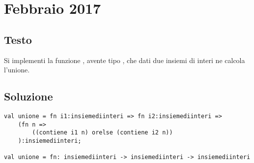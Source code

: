 \section{Febbraio 2017}

\subsection{Testo}

Si implementi la funzione , avente tipo , che dati due insiemi di interi ne calcola l'unione.

\subsection{Soluzione}

\begin{lstlisting}[style = SML, caption = {Definizione della funzione \sml{unione}}]
val unione = fn i1:insiemediinteri => fn i2:insiemediinteri =>
	(fn n =>
		((contiene i1 n) orelse (contiene i2 n))
	):insiemediinteri;

val unione = fn: insiemediinteri -> insiemediinteri -> insiemediinteri
\end{lstlisting}
